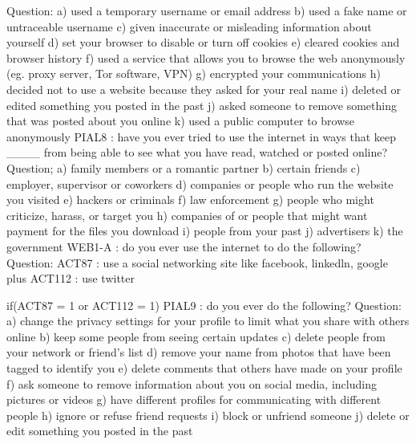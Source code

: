         Question:
            a) used a temporary username or email address
            b) used a fake name or untraceable username
            c) given inaccurate or misleading information about yourself
            d) set your browser to disable or turn off cookies
            e) cleared cookies and browser history
            f) used a service that allows you to browse the web anonymously (eg. proxy server, Tor software, VPN)
            g) encrypted your communications
            h) decided not to use a website because they asked for your real name
            i) deleted or edited something you posted in the past
            j) asked someone to remove something that was posted about you online
            k) used a public computer to browse anonymously
    PIAL8   : have you ever tried to use the internet in ways that keep ____ from being able to see what you have
                read, watched or posted online?
        Question;
            a) family members or a romantic partner
            b) certain friends
            c) employer, supervisor or coworkers
            d) companies or people who run the website you visited
            e) hackers or criminals
            f) law enforcement
            g) people who might criticize, harass, or target you
            h) companies of or people that might want payment for the files you download
            i) people from your past
            j) advertisers
            k) the government
    WEB1-A  : do you ever use the internet to do the following?
        Question:
            ACT87   : use a social networking site like facebook, linkedln, google plus
            ACT112  : use twitter

    if(ACT87 = 1 or ACT112 = 1)
    PIAL9   : do you ever do the following?
        Question:
            a) change the privacy settings for your profile to limit what you share with others online
            b) keep some people from seeing certain updates
            c) delete people from your network or friend's list
            d) remove your name from photos that have been tagged to identify you
            e) delete comments that others have made on your profile
            f) ask someone to remove information about you on social media, including pictures or videos
            g) have different profiles for communicating with different people
            h) ignore or refuse friend requests
            i) block or unfriend someone
            j) delete or edit something you posted in the past

